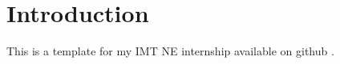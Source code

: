 \section{Introduction}

This is a template for my IMT NE internship available on github \cite{website:github}. \lipsum[1]